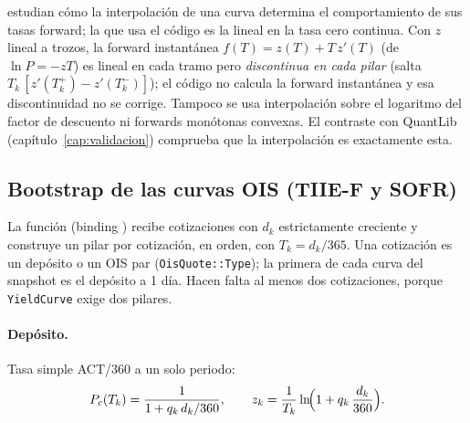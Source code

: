 \begin{diferencia}
  \citet{hagan2006} estudian cómo la interpolación de una curva determina el comportamiento de sus tasas forward; la
  que usa el código es la lineal en la tasa cero continua. Con $z$
  lineal a trozos, la forward instantánea $f(T) = z(T) + T\,z'(T)$ (de $\ln P = -zT$) es lineal en cada tramo pero
  \emph{discontinua en cada pilar} (salta $T_k\,[z'(T_k^+)-z'(T_k^-)]$); el código no calcula la forward
  instantánea y esa discontinuidad no se corrige. Tampoco se usa interpolación sobre el logaritmo del factor de
  descuento ni forwards monótonas convexas. El contraste con QuantLib (capítulo~\ref{cap:validacion}) comprueba que
  la interpolación es exactamente esta.
\end{diferencia}

\subsection{Bootstrap de las curvas OIS (TIIE-F y SOFR)}\label{sec:cap02-ois}

La función  (binding
) recibe cotizaciones
 con $d_k$ estrictamente creciente y construye un
pilar por cotización, en orden, con $T_k = d_k/365$. Una cotización es un depósito o un OIS par
(\texttt{OisQuote::Type}); la primera de cada curva del snapshot es el depósito a 1 día. Hacen falta al menos dos
cotizaciones, porque \texttt{YieldCurve} exige dos pilares.

\paragraph{Depósito.} Tasa simple ACT/360 a un solo periodo:
\begin{equation}\label{eq:cap02-deposito}
  P_{c}(T_k) = \frac{1}{1 + q_k\,d_k/360},
  \qquad z_k = \frac{1}{T_k}\ln\!\Bigl(1 + q_k\,\frac{d_k}{360}\Bigr).
\end{equation}


